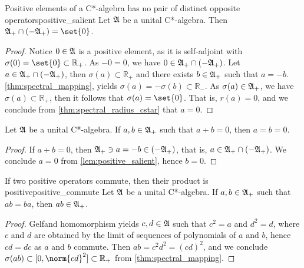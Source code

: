 \begin{lemma}{Positive elements of a C*-algebra has no pair of distinct opposite operators}{positive_salient}
    Let \(\mathfrak{A}\) be a unital C*-algebra. Then \(\algebra{A}_+ \cap (-\algebra{A}_+) = \set{0}\).
\end{lemma}
\begin{proof}
    Notice \(0 \in \mathfrak{A}\) is a positive element, as it is self-adjoint with \(\sigma(0) = \set{0} \subset \mathbb{R}_+\). As \(-0 = 0\), we have \(0 \in \mathfrak{A}_+ \cap (-\mathfrak{A}_+)\). Let \(a \in \mathfrak{A}_+ \cap (-\mathfrak{A}_+)\), then \(\sigma(a) \subset \mathbb{R}_+\) and there exists \(b \in \mathfrak{A}_+\) such that \(a = -b\). \cref{thm:spectral_mapping}, yields \(\sigma(a) = -\sigma(b) \subset \mathbb{R}_-\). As \(\sigma(a)\in \mathfrak{A}_+\), we have \(\sigma(a) \subset \mathbb{R}_+\), then it follows that \(\sigma(a) = \set{0}\). That is, \(r(a) = 0\), and we conclude from \cref{thm:spectral_radius_cstar} that \(a = 0\).
\end{proof}
\begin{corollary}
    Let \(\mathfrak{A}\) be a unital C*-algebra. If \(a, b\in \mathfrak{A}_+\) such that \(a + b = 0\), then \(a = b = 0\).
\end{corollary}
\begin{proof}
    If \(a + b = 0\), then \(\mathfrak{A}_+ \ni a = -b \in (-\mathfrak{A}_+)\), that is, \(a \in \mathfrak{A}_+ \cap (-\mathfrak{A}_+)\). We conclude \(a = 0\) from \cref{lem:positive_salient}, hence \(b = 0\).
\end{proof}

\begin{lemma}{If two positive operators commute, then their product is positive}{positive_commute}
    Let \(\mathfrak{A}\) be a unital C*-algebra. If \(a,b \in \mathfrak{A}_+\) such that \(ab = ba\), then \(ab \in \mathfrak{A}_+\).
\end{lemma}
\begin{proof}
    Gelfand homomorphism yields \(c,d \in \mathfrak{A}\) such that \(c^2 = a\) and \(d^2 = d\), where \(c\) and \(d\) are obtained by the limit of sequences of polynomials of \(a\) and \(b\), hence \(cd = dc\) as \(a\) and \(b\) commute. Then \(ab = c^2 d^2 = (cd)^2\), and we conclude \(\sigma(ab) \subset [0, \norm{cd}^2] \subset \mathbb{R}_+\) from \cref{thm:spectral_mapping}.
\end{proof}

